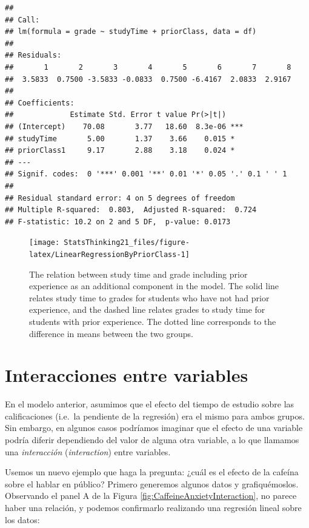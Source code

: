 \documentclass[
  12pt,
]{book}
\theoremstyle{definition}
\theoremstyle{definition}
\theoremstyle{definition}
\theoremstyle{remark}
\begin{document}
\begin{verbatim}
## 
## Call:
## lm(formula = grade ~ studyTime + priorClass, data = df)
## 
## Residuals:
##       1       2       3       4       5       6       7       8 
##  3.5833  0.7500 -3.5833 -0.0833  0.7500 -6.4167  2.0833  2.9167 
## 
## Coefficients:
##             Estimate Std. Error t value Pr(>|t|)    
## (Intercept)    70.08       3.77   18.60  8.3e-06 ***
## studyTime       5.00       1.37    3.66    0.015 *  
## priorClass1     9.17       2.88    3.18    0.024 *  
## ---
## Signif. codes:  0 '***' 0.001 '**' 0.01 '*' 0.05 '.' 0.1 ' ' 1
## 
## Residual standard error: 4 on 5 degrees of freedom
## Multiple R-squared:  0.803,	Adjusted R-squared:  0.724 
## F-statistic: 10.2 on 2 and 5 DF,  p-value: 0.0173
\end{verbatim}

\begin{figure}
\texttt{[image: StatsThinking21\_files/figure-latex/LinearRegressionByPriorClass-1]} \caption{The relation between study time and grade including prior experience as an additional component in the model.  The solid line relates study time to grades for students who have not had prior experience, and the dashed line relates grades to study time for students with prior experience. The dotted line corresponds to the difference in means between the two groups.}\label{fig:LinearRegressionByPriorClass}
\end{figure}

\hypertarget{interacciones-entre-variables}{%
\section{Interacciones entre variables}\label{interacciones-entre-variables}}

En el modelo anterior, asumimos que el efecto del tiempo de estudio sobre las calificaciones (i.e.~la pendiente de la regresión) era el mismo para ambos grupos. Sin embargo, en algunos casos podríamos imaginar que el efecto de una variable podría diferir dependiendo del valor de alguna otra variable, a lo que llamamos una \emph{interacción} (\emph{interaction}) entre variables.

Usemos un nuevo ejemplo que haga la pregunta: ¿cuál es el efecto de la cafeína sobre el hablar en público? Primero generemos algunos datos y grafiquémoslos.
Observando el panel A de la Figura \ref{fig:CaffeineAnxietyInteraction}, no parece haber una relación, y podemos confirmarlo realizando una regresión lineal sobre los datos:
\end{document}
